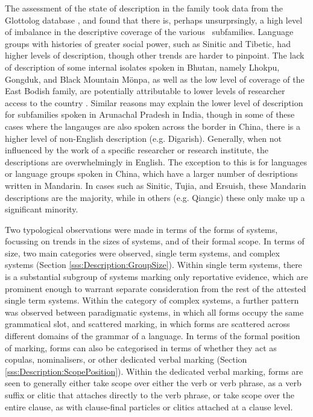 The assessment of the state of description in the family took data from the Glottolog database \cite{glottolog}, and found that there is, perhaps unsurprsingly, a high level of imbalance in the descriptive coverage of the various \lfam\ subfamilies. Language groups with histories of greater social power, such as Sinitic and Tibetic, had higher levels of description, though other trends are harder to pinpoint. The lack of description of some internal isolates spoken in Bhutan, namely Lhokpu, Gongduk, and Black Mountain Mönpa, as well as the low level of coverage of the East Bodish family, are potentially attributable to lower levels of researcher access to the country . Similar reasons may explain the lower level of description for subfamilies spoken in Arunachal Pradesh in India, though in some of these cases where the langauges are also spoken across the border in China, there is a higher level of non-English description (e.g. Digarish). Generally, when not influenced by the work of a specific researcher or research institute, the descriptions are overwhelmingly in English. The exception to this is for languages or language groups spoken in China, which have a larger number of desriptions written in Mandarin. In cases such as Sinitic, Tujia, and Ersuish, these Mandarin descriptions are the majority, while in others (e.g. Qiangic) these only make up a significant minority.

Two typological observations were made in terms of the forms of systems, focussing on trends in the sizes of systems, and of their formal scope. In terms of size, two main categories were observed, single term systems, and complex systems (Section \ref{sss:Description:GroupSize}). Within single term systems, there is a substantial subgroup of systems marking only reportative evidence, which are prominent enough to warrant separate consideration from the rest of the attested single term systems. Within the category of complex systems, a further pattern was observed between paradigmatic systems, in which all forms occupy the same grammatical slot, and scattered marking, in which forms are scattered across different domains of the grammar of a language. In terms of the formal position of marking, forms can also be categorised in terms of whether they act as copulas, nominalisers, or other dedicated verbal marking (Section \ref{sss:Description:ScopePosition}). Within the dedicated verbal marking, forms are seen to generally either take scope over either the verb or verb phrase, as a verb suffix or clitic that attaches directly to the verb phrase, or take scope over the entire clause, as with clause-final particles or clitics attached at a clause level.

